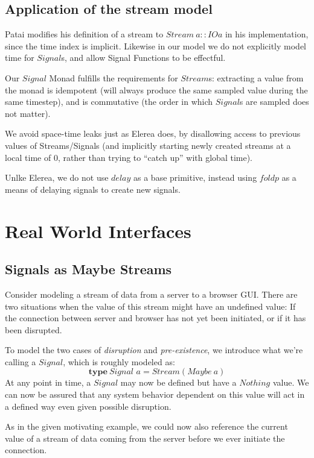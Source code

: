 \documentclass[twocolumn,11pt,english]{article}
\begin{document}
\subsection{Application of the stream model}
Patai modifies his definition of a stream to $Stream~a :: IO a$ in his implementation, since the time index is implicit. Likewise in our model we do not explicitly model time for $Signal$s, and allow Signal Functions to be effectful. 

Our $Signal$ Monad fulfills the requirements for $Stream$s: extracting a value from the monad is idempotent (will always produce the same sampled value during the same timestep), and is commutative (the order in which $Signal$s are sampled does not matter). 

We avoid space-time leaks just as Elerea does, by disallowing access to previous values of Streams/Signals (and implicitly starting newly created streams at a local time of 0, rather than trying to ``catch up'' with global time). 

Unlke Elerea, we do not use $delay$ as a base primitive, instead using $foldp$ as a means of delaying signals to create new signals. 


\section{Real World Interfaces}
\subsection{Signals as Maybe Streams}
  Consider modeling a stream of data from a server to a browser GUI. There are two situations when the value of this stream might have an undefined value: If the connection between server and browser has not yet been initiated, or if it has been disrupted. 

To model the two cases of \textit{disruption} and \textit{pre-existence}, we introduce what we're calling a $Signal$, which is roughly modeled as:
\begin{equation}
  \textbf{type}~\textit{Signal a} = Stream (Maybe~a)
\end{equation}
At any point in time, a $Signal$ may now be defined but have a $Nothing$ value. We can now be assured that any system behavior dependent on this value will act in a defined way even given possible disruption. 

As in the given motivating example, we could now also reference the current value of a stream of data coming from the server before we ever initiate the connection.
\end{document}
